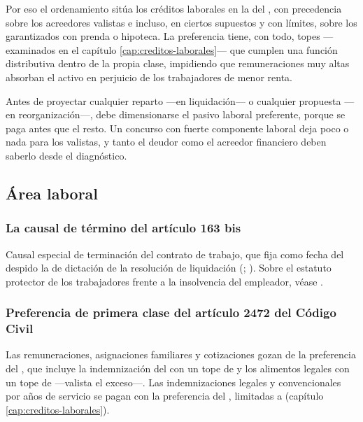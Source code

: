 Por eso el ordenamiento sitúa los créditos laborales en la  del
 \citeyearpar{codigo-civil}, con precedencia sobre los acreedores valistas e
incluso, en ciertos supuestos y con límites, sobre los garantizados con prenda o hipoteca. La
preferencia tiene, con todo, topes ---examinados en el capítulo \ref{cap:creditos-laborales}---
que cumplen una función distributiva dentro de la propia clase, impidiendo que remuneraciones
muy altas absorban el activo en perjuicio de los trabajadores de menor renta.

\begin{foco}
Antes de proyectar cualquier reparto ---en liquidación--- o cualquier propuesta ---en
reorganización---, debe dimensionarse el pasivo laboral preferente, porque se paga antes que
el resto. Un concurso con fuerte componente laboral deja poco o nada para los valistas, y
tanto el deudor como el acreedor financiero deben saberlo desde el diagnóstico.
\end{foco}

\bloqueNormativo

\subsection{Área laboral}

\subsubsection{La causal de término del artículo 163 bis}

Causal especial de terminación del contrato de trabajo, que fija como fecha del despido
la de dictación de la resolución de liquidación (;
\cite{codigo-trabajo}). Sobre el estatuto protector de los trabajadores frente a la
insolvencia del empleador, véase \textcite{doc-proteccion-trabajadores}.

\subsubsection{Preferencia de primera clase del artículo 2472 del Código Civil}

Las remuneraciones, asignaciones familiares y cotizaciones gozan de la preferencia del
 , que incluye la indemnización del   con un tope de
 y los alimentos legales con un tope de  ---valista el exceso---.
Las indemnizaciones legales y convencionales por años de servicio se pagan con la preferencia del
, limitadas a  (capítulo \ref{cap:creditos-laborales}).

